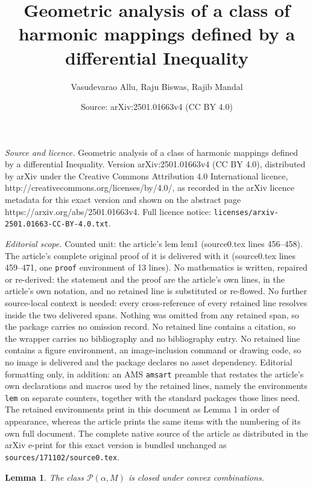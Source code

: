 \documentclass[10pt,a4paper]{amsart}
\title{Geometric analysis of a class of harmonic mappings defined by a differential Inequality}
\author{Vasudevarao Allu, Raju Biswas, Rajib Mandal}
\date{Source: arXiv:2501.01663v4 (CC BY 4.0)}
\newtheorem{lem}{Lemma}
\begin{document}
\maketitle

\noindent\emph{Source and licence.} Geometric analysis of a class of harmonic mappings defined by a differential Inequality. Version arXiv:2501.01663v4 (CC BY 4.0), distributed by arXiv under the Creative Commons Attribution 4.0 International licence, http://creativecommons.org/licenses/by/4.0/, as recorded in the arXiv licence metadata for this exact version and shown on the abstract page https://arxiv.org/abs/2501.01663v4. Full licence notice: \texttt{licenses/arxiv-2501.01663-CC-BY-4.0.txt}.\par\smallskip

\noindent\textit{Editorial scope.} Counted unit: the article's lem lem1 (source0.tex lines 456--458). The article's complete original proof of it is delivered with it (source0.tex lines 459--471, one \texttt{proof} environment of 13 lines). No mathematics is written, repaired or re-derived: the statement and the proof are the article's own lines, in the article's own notation, and no retained line is substituted or re-flowed.  No further source-local context is needed: every cross-reference of every retained line resolves inside the two delivered spans.  Nothing was omitted from any retained span, so the package carries no omission record.  No retained line contains a citation, so the wrapper carries no bibliography and no bibliography entry.  No retained line contains a figure environment, an image-inclusion command or drawing code, so no image is delivered and the package declares no asset dependency.  Editorial formatting only, in addition: an AMS \texttt{amsart} preamble that restates the article's own declarations and macros used by the retained lines, namely the environments \texttt{lem} on separate counters, together with the standard packages those lines need.  The retained environments print in this document as Lemma 1 in order of appearance, whereas the article prints the same items with the numbering of its own full document.  The complete native source of the article as distributed in the arXiv e-print for this exact version is bundled unchanged as \texttt{sources/171102/source0.tex}.
\begin{lem}\label{lem1}
The class \(\mathcal{P}(\alpha, M)\) is closed under convex combinations.
\end{lem}
\end{document}
